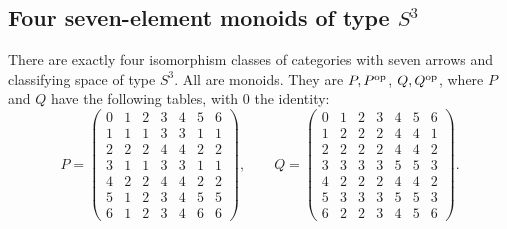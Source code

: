 \subsection{Four seven-element monoids of type $S^3$}
\begin{theorem}\label{thm:C-S3-four}
There are exactly four isomorphism classes of categories with seven arrows
and classifying space of type $S^3$. All are monoids. They are $P,P^{\mathrm {op}}$,
$Q,Q^{\mathrm {op}}$, where $P$ and $Q$ have the following tables, with $0$ the
identity:
\[
 P=\begin{pmatrix}
0&1&2&3&4&5&6\\
1&1&1&3&3&1&1\\
2&2&2&4&4&2&2\\
3&1&1&3&3&1&1\\
4&2&2&4&4&2&2\\
5&1&2&3&4&5&5\\
6&1&2&3&4&6&6
\end{pmatrix},\qquad
 Q=\begin{pmatrix}
0&1&2&3&4&5&6\\
1&2&2&2&4&4&1\\
2&2&2&2&4&4&2\\
3&3&3&3&5&5&3\\
4&2&2&2&4&4&2\\
5&3&3&3&5&5&3\\
6&2&2&3&4&5&6
\end{pmatrix}.
\]
\end{theorem}
